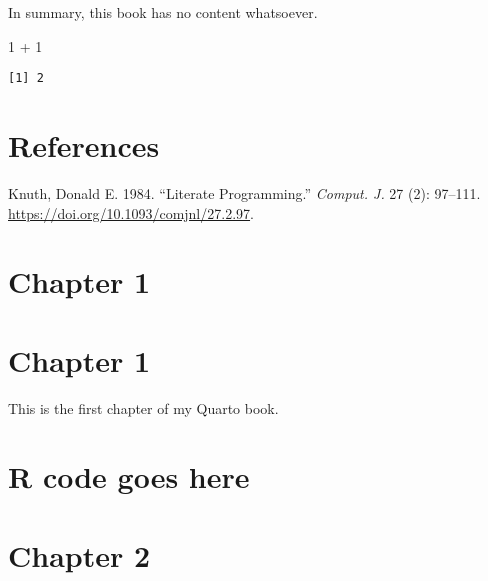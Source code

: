 \documentclass[
  letterpaper,
  DIV=11,
  numbers=noendperiod]{scrreprt}
\newenvironment{Shaded}{\begin{snugshade}}{\end{snugshade}}
\newcommand{\DecValTok}[1]{\textcolor[rgb]{0.68,0.00,0.00}{#1}}
\newcommand{\SpecialCharTok}[1]{\textcolor[rgb]{0.37,0.37,0.37}{#1}}
\newlength{\cslhangindent}
\newenvironment{CSLReferences}[2] %
 {\begin{list}{}{%
  \setlength{\itemindent}{0pt}
  \setlength{\leftmargin}{0pt}
  \setlength{\parsep}{0pt}
  \ifodd #1
   \setlength{\leftmargin}{\cslhangindent}
   \setlength{\itemindent}{-1\cslhangindent}
  \fi
  \setlength{\itemsep}{#2\baselineskip}}}
 {\end{list}}
\begin{document}
In summary, this book has no content whatsoever.

\begin{Shaded}
\begin{Highlighting}[]
\DecValTok{1} \SpecialCharTok{+} \DecValTok{1}
\end{Highlighting}
\end{Shaded}

\begin{verbatim}
[1] 2
\end{verbatim}


\chapter*{References}\label{references}


\label{refs}
\begin{CSLReferences}{1}{0}
Knuth, Donald E. 1984. {``Literate Programming.''} \emph{Comput. J.} 27
(2): 97--111. \url{https://doi.org/10.1093/comjnl/27.2.97}.

\end{CSLReferences}


\chapter{Chapter 1}\label{chapter-1}


\chapter{Chapter 1}\label{chapter-1-1}

This is the first chapter of my Quarto book.


\chapter{R code goes here}\label{r-code-goes-here}


\chapter{Chapter 2}\label{chapter-2}
\end{document}
